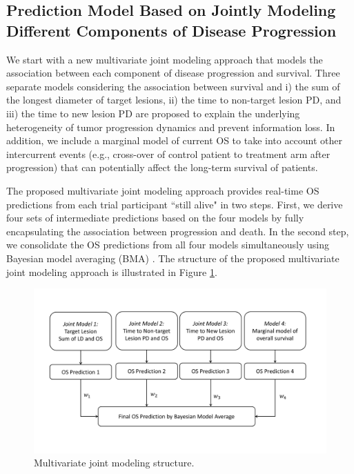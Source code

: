 \documentclass[aoas]{imsart}
\theoremstyle{plain}
\theoremstyle{remark}
\begin{document}
\subsection{Prediction Model Based on Jointly Modeling Different Components of Disease Progression}
\label{sec:jm}

We start with a new multivariate joint modeling approach that models the association between each component of disease progression and survival. Three separate models considering the association between survival and i) the sum of the longest diameter of target lesions, ii) the time to non-target lesion PD, and iii) the time to new lesion PD are proposed to explain the underlying heterogeneity of tumor progression dynamics and prevent information loss. In addition, we include a marginal model of current OS to take into account other intercurrent events (e.g., cross-over of control patient to treatment arm after progression) that can potentially affect the long-term survival of patients. 

The proposed multivariate joint modeling approach provides real-time OS predictions from each trial participant ``still alive" in two steps. First, we derive four sets of intermediate predictions based on the four models by fully encapsulating the association between progression and death. In the second step, we consolidate the OS predictions from all four models simultaneously using Bayesian model averaging (BMA) \citep{hoeting1999bayesian}. The structure of the proposed multivariate joint modeling approach is illustrated in Figure \ref{fig:JM}. 

\begin{figure}
\centering
\includegraphics[width=\textwidth]{img/JM.pdf}
\caption{Multivariate joint modeling structure.} 
\label{fig:JM}
\end{figure}
\end{document}

